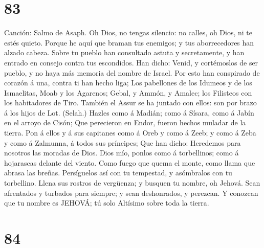 \hypertarget{section-82}{%
\section{83}\label{section-82}}

 Canción: Salmo de Asaph. Oh Dios, no tengas silencio: no
calles, oh Dios, ni te estés quieto.  Porque he aquí que
braman tus enemigos; y tus aborrecedores han alzado cabeza.
 Sobre tu pueblo han consultado astuta y secretamente, y
han entrado en consejo contra tus escondidos.  Han dicho:
Venid, y cortémoslos de ser pueblo, y no haya más memoria del nombre de
Israel.  Por esto han conspirado de corazón á una, contra
ti han hecho liga;  Los pabellones de los Idumeos y de los
Ismaelitas, Moab y los Agarenos;  Gebal, y Ammón, y
Amalec; los Filisteos con los habitadores de Tiro. 
También el Assur se ha juntado con ellos: son por brazo á los hijos de
Lot. (Selah.)  Hazles como á Madián; como á Sísara, como á
Jabín en el arroyo de Cisón;  Que perecieron en Endor,
fueron hechos muladar de la tierra.  Pon á ellos y á sus
capitanes como á Oreb y como á Zeeb; y como á Zeba y como á Zalmunna, á
todos sus príncipes;  Que han dicho: Heredemos para
nosotros las moradas de Dios.  Dios mío, ponlos como á
torbellinos; como á hojarascas delante del viento.  Como
fuego que quema el monte, como llama que abrasa las breñas.
 Persíguelos así con tu tempestad, y asómbralos con tu
torbellino.  Llena sus rostros de vergüenza; y busquen tu
nombre, oh Jehová.  Sean afrentados y turbados para
siempre; y sean deshonrados, y perezcan.  Y conozcan que
tu nombre es JEHOVÁ; tú solo Altísimo sobre toda la tierra.

\hypertarget{section-83}{%
\section{84}\label{section-83}}

